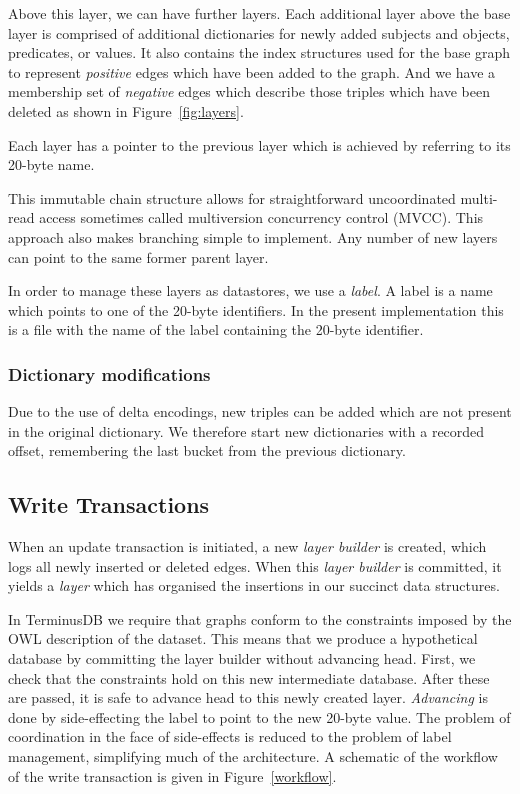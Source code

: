 \documentclass[10pt, a4paper, twocolumn]{article} %
\begin{document}
Above this layer, we can have further layers. Each additional layer
above the base layer is comprised of additional dictionaries for newly
added subjects and objects, predicates, or values. It also contains the
index structures used for the base graph to represent {\em positive}
edges which have been added to the graph. And we have a membership set
of {\em negative} edges which describe those triples which have been
deleted as shown in Figure~\ref{fig:layers}.

Each layer has a pointer to the previous layer which is achieved by
referring to its 20-byte name.

This immutable chain structure allows for straightforward uncoordinated
multi-read access sometimes called multiversion concurrency control
(MVCC)\autocite{Mohan:1992:EFM:130283.130306}\autocite{Sadoghi:2014:RDL:2733004.2733006}. This
approach also makes branching simple to implement. Any number of new
layers can point to the same former parent layer.

In order to manage these layers as datastores, we use a {\em label}. A
label is a name which points to one of the 20-byte identifiers. In the
present implementation this is a file with the name of the label
containing the 20-byte identifier.

\subsubsection{Dictionary modifications}

Due to the use of delta encodings, new triples can be added which are
not present in the original dictionary. We therefore start new
dictionaries with a recorded offset, remembering the last bucket from
the previous dictionary.

\subsection{Write Transactions}

When an update transaction is initiated, a new {\em layer builder} is
created, which logs all newly inserted or deleted edges. When this
{\em layer builder} is committed, it yields a {\em layer} which has
organised the insertions in our succinct data structures.

In TerminusDB we require that graphs conform to the constraints
imposed by the OWL description of the dataset. This means that we
produce a hypothetical database by committing the layer builder
without advancing head. First, we check that the constraints hold on this
new intermediate database. After these are passed, it is safe to
advance head to this newly created layer. {\em Advancing} is done by
side-effecting the label to point to the new 20-byte value. The
problem of coordination in the face of side-effects is reduced to the
problem of label management, simplifying much of the architecture. A
schematic of the workflow of the write transaction is given in
Figure~\ref{workflow}.
\end{document}
